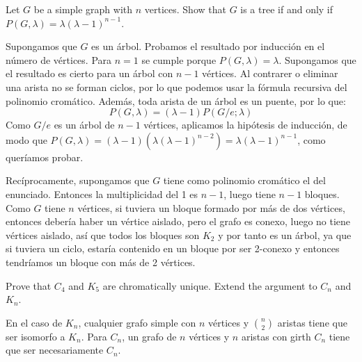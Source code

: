 \documentclass[twoside]{article}
\begin{document}
\newpage

\begin{ejercicio}{3.10}
Let $G$ be a simple graph with $n$ vertices. Show that $G$ is a tree if and only if $P(G, λ) =
λ(λ − 1)^{n−1}$.

\end{ejercicio}
\begin{solucion}
Supongamos que $G$ es un árbol. Probamos el resultado por inducción en el número de vértices. Para $n=1$ se cumple porque $P(G,\lambda)=\lambda$. Supongamos que el resultado es cierto para un árbol con $n-1$ vértices. Al contrarer o eliminar una arista no se forman ciclos, por lo que podemos usar la fórmula recursiva del polinomio cromático. Además, toda arista de un árbol es un puente, por lo que:
\[
P(G,\lambda)=(\lambda-1)P(G/e;\lambda)
\]
Como $G/e$ es un árbol de $n-1$ vértices, aplicamos la hipótesis de inducción, de modo que $P(G,\lambda)=(\lambda-1)(\lambda(\lambda-1)^{n-2})=\lambda(\lambda-1)^{n-1}$, como queríamos probar.

Recíprocamente, supongamos que $G$ tiene como polinomio cromático el del enunciado. Entonces la multiplicidad del 1 es $n-1$, luego tiene $n-1$ bloques. Como $G$ tiene $n$ vértices, si tuviera un bloque formado por más de dos vértices, entonces debería haber un vértice aislado, pero el grafo es conexo, luego no tiene vértices aislado, así que todos los bloques son $K_2$ y por tanto es un árbol, ya que si tuviera un ciclo, estaría contenido en un bloque por ser 2-conexo y entonces tendríamos un bloque con más de 2 vértices.
\end{solucion}

\newpage

\begin{ejercicio}{3.11}
 Prove that $C_4$ and $K_5$ are chromatically unique. Extend the argument to $C_n$ and $K_n$.
\end{ejercicio}
\begin{solucion}
En el caso de $K_n$, cualquier grafo simple con $n$ vértices y $\binom{n}{2}$ aristas tiene que ser isomorfo a $K_n$. Para $C_n$, un grafo de $n$ vértices y $n$ aristas con girth $C_n$ tiene que ser necesariamente $C_n$. 
\end{solucion}

\newpage
\end{document}
